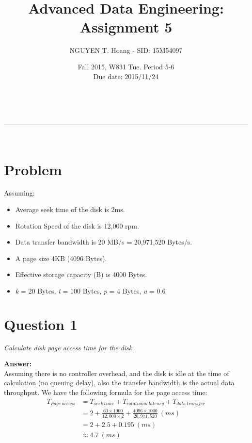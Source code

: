 \documentclass[a4paper,12pt]{article}
\makeatletter
\newcommand{\linia}{\rule{\linewidth}{0.5pt}}
\renewcommand{\maketitle} {
\begin{center}
\vspace{2ex}
{\LARGE \textsc{\@title}}
\vspace{1ex}
\\
\linia\\
\@author \hfill \@date
\vspace{4ex}
\end{center}
}
\makeatother
\begin{document}
\title{Advanced Data Engineering: Assignment 5}

\author{NGUYEN T. Hoang - SID: 15M54097}

\date{Fall 2015, W831 Tue. Period 5-6 \\ \hfill Due date: 2015/11/24}

\maketitle

\vfill

\section*{Problem}

Assuming:
\begin{itemize}
    \setlength{\itemsep}{0cm}
    \setlength{\parskip}{0cm}
    \item Average seek time of the disk is 2ms.
    \item Rotation Speed of the disk is 12,000 rpm.
    \item Data transfer bandwidth is 20 MB/s = 20,971,520 Bytes/s.
    \item A page size 4KB (4096 Bytes).
    \item Effective storage capacity (B) is 4000 Bytes.
    \item \emph{k} = 20 Bytes, \emph{t} = 100 Bytes, \emph{p} = 4 Bytes, \emph{u} = 0.6
\end{itemize}
\section*{Question 1}

\textit{Calculate disk page access time for the disk.} 

\noindent
\textbf{Answer:} \\ 
Assuming there is no controller overhead, and the disk is idle at the time of calculation (no queuing delay), also the transfer bandwidth is the actual data throughput. We have the following formula for the page access time:
\begin{equation*}
    \begin{aligned}
        T_{Page\ access} &= T_{seek\ time} + T_{rotational\ latency} + T_{data\ transfer} \\
        & = 2 + \frac{60 \times 1000}{12,000 \times 2} + \frac{4096 \times 1000}{20,971,520} \ (ms) \\
        & = 2 + 2.5 + 0.195 \ (ms) \\
        & \approx 4.7 \ (ms)
    \end{aligned}
\end{equation*}
\end{document}
